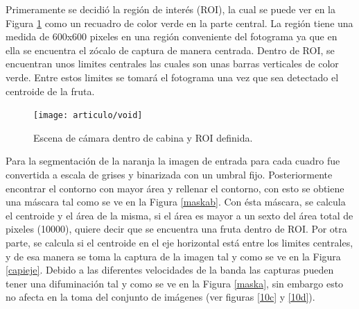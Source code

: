 \documentclass[twoside,spanish,ESP,MSc]{plantillaLabUPV}
\theoremstyle{definition}
\begin{document}
Primeramente se decidió la región de interés (ROI), la cual se puede ver en la Figura \ref{fig:void} como un recuadro de color verde en la parte central. La región tiene una medida de 600x600 pixeles en una región conveniente del fotograma ya que en ella se encuentra el zócalo de captura de manera centrada. Dentro de ROI, se encuentran unos limites centrales las cuales son unas barras verticales de color verde. Entre estos limites se tomará el fotograma una vez que sea detectado el centroide de la fruta.

\begin{figure}
	\centering
	\texttt{[image: articulo/void]}
	\caption{Escena de cámara dentro de cabina y ROI definida.}
	\label{fig:void}
\end{figure}

Para la segmentación de la naranja la imagen de entrada para cada cuadro fue convertida a escala de grises y binarizada con un umbral fijo. Posteriormente encontrar el contorno con mayor área y rellenar el contorno, con esto se obtiene una máscara tal como se ve en la Figura \ref{maskab}. Con ésta máscara, se calcula el centroide y el área de la misma, si el área es mayor a un sexto del área total de pixeles (10000), quiere decir que se encuentra una fruta dentro de ROI. Por otra parte, se calcula si el centroide en el eje horizontal está entre los limites centrales, y de esa manera se toma la captura de la imagen tal y como se ve en la Figura \ref{capieje}. Debido a las diferentes velocidades de la banda las capturas pueden tener una difuminación tal y como se ve en la Figura \ref{maska}, sin embargo esto no afecta en la toma del conjunto de imágenes (ver figuras \ref{10c} y \ref{10d}).
\end{document}
